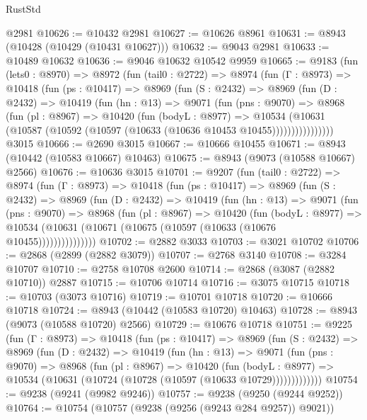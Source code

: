 \begin{lexlean}{RustStd}
\begin{coremodule}
{\begin{coremodule}
{{{{{{{{{{{{{{{{{{{{{{{{{{{{{{{{{{{{{{{    @2981
@10626 := @10432 @2981
@10627 := @10626 @8961
@10631 := @8943 (@10428 (@10429 (@10431 @10627)))
@10632 := @9043 @2981
@10633 := @10489 @10632
@10636 := @9046 @10632 @10542 @9959
@10665 := @9183
    (fun (lets0 : @8970) =>
    @8972
      (fun (tail0 : @2722) =>
      @8974
        (fun (Γ : @8973) =>
        @10418
          (fun (ps : @10417) =>
          @8969
            (fun (S : @2432) =>
            @8969
              (fun (D : @2432) =>
              @10419
                (fun (hn : @13) =>
                @9071
                  (fun (pns : @9070) =>
                  @8968
                    (fun (pl : @8967) =>
                    @10420
                      (fun (bodyL : @8977) =>
                      @10534
                        (@10631
                          (@10587 (@10592 (@10597 (@10633 (@10636 @10453 @10455))))))))))))))))
    @3015
@10666 := @2690 @3015
@10667 := @10666 @10455
@10671 := @8943 (@10442 (@10583 @10667) @10463)
@10675 := @8943 (@9073 (@10588 @10667) @2566)
@10676 := @10636 @3015
@10701 := @9207
    (fun (tail0 : @2722) =>
    @8974
      (fun (Γ : @8973) =>
      @10418
        (fun (ps : @10417) =>
        @8969
          (fun (S : @2432) =>
          @8969
            (fun (D : @2432) =>
            @10419
              (fun (hn : @13) =>
              @9071
                (fun (pns : @9070) =>
                @8968
                  (fun (pl : @8967) =>
                  @10420
                    (fun (bodyL : @8977) =>
                    @10534 (@10631 (@10671 (@10675 (@10597 (@10633 (@10676 @10455)))))))))))))))
@10702 := @2882 @3033
@10703 := @3021 @10702
@10706 := @2868 (@2899 (@2882 @3079))
@10707 := @2768 @3140
@10708 := @3284 @10707
@10710 := @2758 @10708 @2600
@10714 := @2868 (@3087 (@2882 @10710)) @2887
@10715 := @10706 @10714
@10716 := @3075 @10715
@10718 := @10703 (@3073 @10716)
@10719 := @10701 @10718
@10720 := @10666 @10718
@10724 := @8943 (@10442 (@10583 @10720) @10463)
@10728 := @8943 (@9073 (@10588 @10720) @2566)
@10729 := @10676 @10718
@10751 := @9225
    (fun (Γ : @8973) =>
    @10418
      (fun (ps : @10417) =>
      @8969
        (fun (S : @2432) =>
        @8969
          (fun (D : @2432) =>
          @10419
            (fun (hn : @13) =>
            @9071
              (fun (pns : @9070) =>
              @8968
                (fun (pl : @8967) =>
                @10420
                  (fun (bodyL : @8977) =>
                  @10534 (@10631 (@10724 (@10728 (@10597 (@10633 @10729)))))))))))))
@10754 := @9238 (@9241 (@9982 @9246))
@10757 := @9238 (@9250 (@9244 @9252))
@10764 := @10754 (@10757 (@9238 (@9256 (@9243 @284 @9257)) @9021))
}}}}}}}}}}}}}}}}}}}}}}}}}}}}}}}}}}}}}}}
\end{coremodule}}
\end{coremodule}
\end{lexlean}
